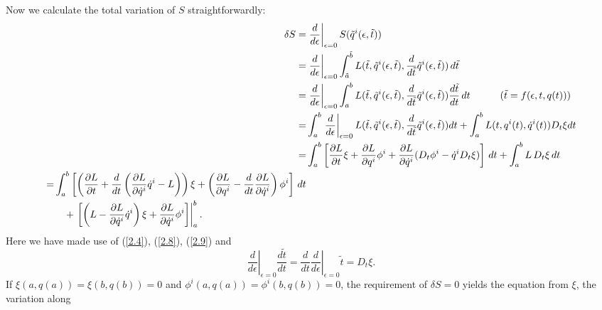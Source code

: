 \documentclass[a4paper,a4paper]{article}
\begin{document}
\noindent
Now we calculate the total variation of $S$ straightforwardly:
\begin{align}
\delta
S=&\left.\frac{d}{d\epsilon}\right|_{\epsilon=0}S(\tilde{q}^i(\epsilon,
\tilde{t}))
           \notag\\
        =&\left.\frac{d}{d\epsilon}\right|_{\epsilon=0}\int_{\tilde{a}}^{\tilde{b}}
          L(\tilde{t}, \tilde{q}^i(\epsilon, \tilde{t}), \frac{d}{d\tilde{t}}
          \tilde{q}^i(\epsilon, \tilde{t}))\,d\tilde{t}\notag\\
       =&\left.\frac{d}{d\epsilon}\right|_{\epsilon=0}\int_{a}^{b}
          L(\tilde{t}, \tilde{q}^i(\epsilon, \tilde{t}),\frac{d}{d\tilde{t}}
          \tilde{q}^i(\epsilon, \tilde{t}))
          \frac{d\tilde{t}}{dt}\,dt
          \quad\quad\quad (\tilde{t}=f(\epsilon, t, q(t)))\notag\\
        =&\int_{a}^{b}\left.\frac{d}{d\epsilon}\right|_{\epsilon=0}
           L(\tilde{t}, \tilde{q}^i(\epsilon, \tilde{t}), \frac{d}{d\tilde{t}}
          \tilde{q}^i(\epsilon, \tilde{t}))dt+\int_{a}^{b}L(t, q^i(t), \dot{q}^i(t))
           D_{t}\xi dt \notag\\
        =&\int_{a}^{b}\left[\frac{\partial L}{\partial t}\xi+
            \frac{\partial L}{\partial q^i}\phi^i+\frac{\partial L}{\partial \dot{q}^i}
            (D_{t}\phi^i-\dot{q}^iD_{t}\xi)\right]\,dt
            +\int_{a}^{b}L\,D_{t}\xi\,dt \notag\\
         \begin{split}
         =&\int_{a}^{b}\left[\left(\frac{\partial L}{\partial t}+\frac{d}{dt}\left(
           \frac{\partial L}{\partial \dot{q}^i}\dot{q}^i-L\right)\right)\xi+\left(
          \frac{\partial L}{\partial q^i}-\frac{d}{dt}\frac{\partial L}{\partial \dot{q}^i}
          \right)\phi^i\right]\,dt \\
          &\quad +\left.\left[\left(L-\frac{\partial L}{\partial \dot{q}^i}
           \dot{q}^i\right)\xi
           +\frac{\partial L}{\partial \dot{q}^i}\phi^i\right]\right|_{a}^{b}.
         \end{split} \label{2.10}
\end{align}
Here  we have made use of  (\ref{2.4}), (\ref{2.8}), (\ref{2.9}) and %
$$\left.\frac{d}{d\epsilon}\right|_{\epsilon=0}
\frac{d\tilde{t}}{dt}=\frac{d}{dt}\left.\frac{d}{d\epsilon}\right|_{\epsilon=0}
\tilde{t} =D_{t}\xi.$$%
\noindent If $\xi(a, q(a))=\xi(b, q(b))=0$ and $\phi^i(a,
q(a))=\phi^i(b, q(b))=0$,
 the requirement of $\delta S
=0$ yields the equation from $\xi$, the variation along
\end{document}
